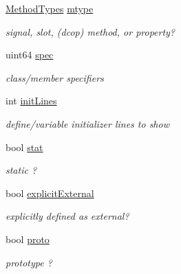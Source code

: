 \begin{DoxyCompactItemize}
\mbox{\label{class_entry_a4669c5294781bce55ce0ad654460acbd}} 
\mbox{\hyperlink{types_8h_a0872178db42722c310fe6117189ed441}{Method\+Types}} \mbox{\hyperlink{class_entry_a4669c5294781bce55ce0ad654460acbd}{mtype}}
\begin{DoxyCompactList}\small\item\em signal, slot, (dcop) method, or property? \end{DoxyCompactList}\item 
\mbox{\label{class_entry_a3019e7d39a5c382fb924e22913198133}} 
uint64 \mbox{\hyperlink{class_entry_a3019e7d39a5c382fb924e22913198133}{spec}}
\begin{DoxyCompactList}\small\item\em class/member specifiers \end{DoxyCompactList}\item 
\mbox{\label{class_entry_ae283a992b9a74c6925c6f602ba7d830d}} 
int \mbox{\hyperlink{class_entry_ae283a992b9a74c6925c6f602ba7d830d}{init\+Lines}}
\begin{DoxyCompactList}\small\item\em define/variable initializer lines to show \end{DoxyCompactList}\item 
\mbox{\label{class_entry_ab5f1d92a0b5d8abdf4d42cefc134fdfa}} 
bool \mbox{\hyperlink{class_entry_ab5f1d92a0b5d8abdf4d42cefc134fdfa}{stat}}
\begin{DoxyCompactList}\small\item\em static ? \end{DoxyCompactList}\item 
\mbox{\label{class_entry_a6c5a4c9eda694f2bfd2037d7da08ba5d}} 
bool \mbox{\hyperlink{class_entry_a6c5a4c9eda694f2bfd2037d7da08ba5d}{explicit\+External}}
\begin{DoxyCompactList}\small\item\em explicitly defined as external? \end{DoxyCompactList}\item 
\mbox{\label{class_entry_a14c9abc36afe46d02521ef846e6bcc27}} 
bool \mbox{\hyperlink{class_entry_a14c9abc36afe46d02521ef846e6bcc27}{proto}}
\begin{DoxyCompactList}\small\item\em prototype ? \end{DoxyCompactList}\item 

\end{DoxyCompactItemize}
